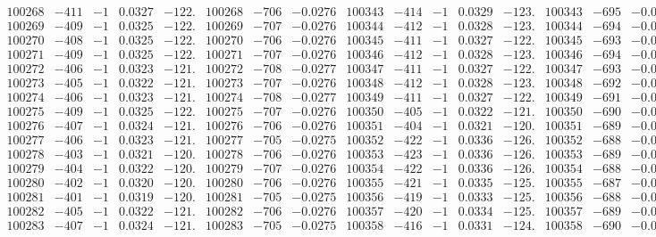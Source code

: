 \documentclass[11pt,reqno,a4letter]{article}
\numberwithin{figure}{section}
\numberwithin{table}{section}
\theoremstyle{plain}
\numberwithin{theorem}{section}
\theoremstyle{definition}
\begin{document}
\begin{table}[ht!]
\begin{equation*}
{\begin{array}{ccccc|ccc||ccccc|ccc}
100268 & -411 & -1 & 0.0327 & -122. & 100268 & -706 & -0.0276 & 100343 & -414 & -1 & 0.0329 & -123. & 100343 & -695 & -0.0271  \\
100269 & -409 & -1 & 0.0325 & -122. & 100269 & -707 & -0.0276 & 100344 & -412 & -1 & 0.0328 & -123. & 100344 & -694 & -0.0271  \\
100270 & -408 & -1 & 0.0325 & -122. & 100270 & -706 & -0.0276 & 100345 & -411 & -1 & 0.0327 & -122. & 100345 & -693 & -0.0271  \\
100271 & -409 & -1 & 0.0325 & -122. & 100271 & -707 & -0.0276 & 100346 & -412 & -1 & 0.0328 & -123. & 100346 & -694 & -0.0271  \\
100272 & -406 & -1 & 0.0323 & -121. & 100272 & -708 & -0.0277 & 100347 & -411 & -1 & 0.0327 & -122. & 100347 & -693 & -0.0271  \\
100273 & -405 & -1 & 0.0322 & -121. & 100273 & -707 & -0.0276 & 100348 & -412 & -1 & 0.0328 & -123. & 100348 & -692 & -0.0270  \\
100274 & -406 & -1 & 0.0323 & -121. & 100274 & -708 & -0.0277 & 100349 & -411 & -1 & 0.0327 & -122. & 100349 & -691 & -0.0270  \\
100275 & -409 & -1 & 0.0325 & -122. & 100275 & -707 & -0.0276 & 100350 & -405 & -1 & 0.0322 & -121. & 100350 & -690 & -0.0269  \\
100276 & -407 & -1 & 0.0324 & -121. & 100276 & -706 & -0.0276 & 100351 & -404 & -1 & 0.0321 & -120. & 100351 & -689 & -0.0269  \\
100277 & -406 & -1 & 0.0323 & -121. & 100277 & -705 & -0.0275 & 100352 & -422 & -1 & 0.0336 & -126. & 100352 & -688 & -0.0269  \\
100278 & -403 & -1 & 0.0321 & -120. & 100278 & -706 & -0.0276 & 100353 & -423 & -1 & 0.0336 & -126. & 100353 & -689 & -0.0269  \\
100279 & -404 & -1 & 0.0322 & -120. & 100279 & -707 & -0.0276 & 100354 & -422 & -1 & 0.0336 & -126. & 100354 & -688 & -0.0269  \\
100280 & -402 & -1 & 0.0320 & -120. & 100280 & -706 & -0.0276 & 100355 & -421 & -1 & 0.0335 & -125. & 100355 & -687 & -0.0268  \\
100281 & -401 & -1 & 0.0319 & -120. & 100281 & -705 & -0.0275 & 100356 & -419 & -1 & 0.0333 & -125. & 100356 & -688 & -0.0269  \\
100282 & -405 & -1 & 0.0322 & -121. & 100282 & -706 & -0.0276 & 100357 & -420 & -1 & 0.0334 & -125. & 100357 & -689 & -0.0269  \\
100283 & -407 & -1 & 0.0324 & -121. & 100283 & -705 & -0.0275 & 100358 & -416 & -1 & 0.0331 & -124. & 100358 & -690 & -0.0269  \\

\end{array}}
\end{equation*}
\end{table}
\end{document}
